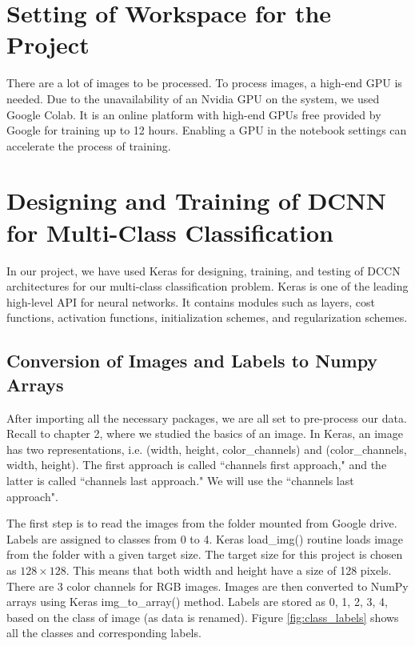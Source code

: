 \section{Setting of Workspace for the Project}
There are a lot of images to be processed. To process images, a high-end GPU is
needed. Due to the unavailability of an Nvidia GPU on the system, we used Google Colab.
It is an online platform with high-end GPUs free provided by Google for training
up to 12 hours. Enabling a GPU in the notebook settings can accelerate the process of
training.
\section{Designing and Training of DCNN for Multi-Class Classification}
In our project, we have used Keras for designing, training, and testing of 
DCCN architectures for our multi-class classification problem.
Keras is one of the leading high-level API for neural networks. It contains
modules such as layers, cost functions, activation functions, initialization
schemes, and regularization schemes. 
\subsection{Conversion of Images and Labels to Numpy Arrays}
After importing all the necessary packages, we are all set to pre-process our data.
Recall to chapter 2, where we studied the basics of an image. In Keras, an image has two
representations, i.e. (width, height, color\_channels) and (color\_channels, width, height).
The first approach is called ``channels first approach," and
the latter is called ``channels last approach."
We will use the ``channels last approach".

The first step is to read the images from the folder mounted from Google drive.
Labels are assigned to classes from 0 to 4. Keras load\_img() routine loads image
from the folder with a given target size. The target size for this project is chosen as
$128 \times 128$. This means that both width and height have a size of 128 pixels.
There are 3 color channels for RGB images. Images are then converted to NumPy arrays using
Keras img\_to\_array() method. Labels are stored as 0, 1, 2, 3, 4, based on the class of image (as data is renamed).
Figure \ref{fig:class_labels} shows all the classes and corresponding labels.

